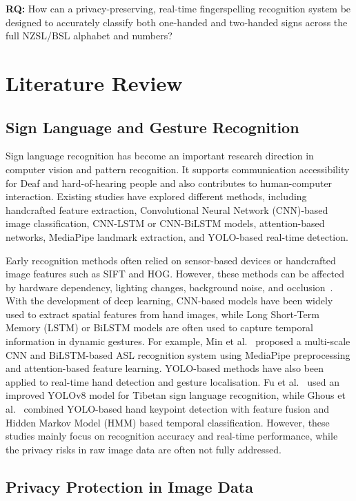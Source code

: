 \documentclass[conference]{IEEEtran}
\begin{document}
\textbf{RQ:} How can a privacy-preserving, real-time fingerspelling recognition system be designed to accurately classify both one-handed and two-handed signs across the full NZSL/BSL alphabet and numbers?

\section{Literature Review}

\subsection{Sign Language and Gesture Recognition}

Sign language recognition has become an important research direction in computer vision and pattern recognition. It supports communication accessibility for Deaf and hard-of-hearing people and also contributes to human-computer interaction. Existing studies have explored different methods, including handcrafted feature extraction, Convolutional Neural Network (CNN)-based image classification, CNN-LSTM or CNN-BiLSTM models, attention-based networks, MediaPipe landmark extraction, and YOLO-based real-time detection.

Early recognition methods often relied on sensor-based devices or handcrafted image features such as SIFT and HOG. However, these methods can be affected by hardware dependency, lighting changes, background noise, and occlusion~\cite{ghous2025}. With the development of deep learning, CNN-based models have been widely used to extract spatial features from hand images, while Long Short-Term Memory (LSTM) or BiLSTM models are often used to capture temporal information in dynamic gestures. For example, Min et al.~\cite{min2025asl} proposed a multi-scale CNN and BiLSTM-based ASL recognition system using MediaPipe preprocessing and attention-based feature learning. YOLO-based methods have also been applied to real-time hand detection and gesture localisation. Fu et al.~\cite{fu2025} used an improved YOLOv8 model for Tibetan sign language recognition, while Ghous et al.~\cite{ghous2025} combined YOLO-based hand keypoint detection with feature fusion and Hidden Markov Model (HMM) based temporal classification. However, these studies mainly focus on recognition accuracy and real-time performance, while the privacy risks in raw image data are often not fully addressed.

\subsection{Privacy Protection in Image Data}
\end{document}
